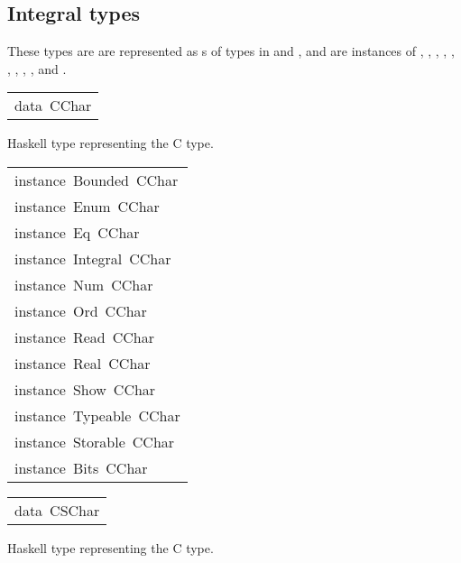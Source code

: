 \subsection{Integral types
}
These types are are represented as s of
 types in  and , and are instances of
 , , , ,
 , , ,
 , ,  and
 .
\par

\begin{haddockdesc}
\item[\begin{tabular}{@{}l}
data\ CChar
\end{tabular}]\haddockbegindoc
Haskell type representing the C  type.
\par

\end{haddockdesc}
\begin{haddockdesc}
\item[\begin{tabular}{@{}l}
instance\ Bounded\ CChar\\instance\ Enum\ CChar\\instance\ Eq\ CChar\\instance\ Integral\ CChar\\instance\ Num\ CChar\\instance\ Ord\ CChar\\instance\ Read\ CChar\\instance\ Real\ CChar\\instance\ Show\ CChar\\instance\ Typeable\ CChar\\instance\ Storable\ CChar\\instance\ Bits\ CChar
\end{tabular}]
\end{haddockdesc}
\begin{haddockdesc}
\item[\begin{tabular}{@{}l}
data\ CSChar
\end{tabular}]\haddockbegindoc
Haskell type representing the C  type.
\par

\end{haddockdesc}
